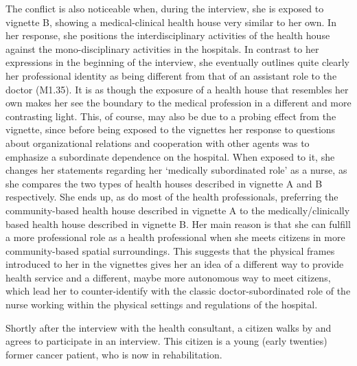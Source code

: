 \par
The conflict is also noticeable when, during the interview, she is exposed to vignette B, showing a medical-clinical health house very similar to her own. In her response, she positions the interdisciplinary activities of the health house against the mono-disciplinary activities in the hospitals. In contrast to her expressions in the beginning of the interview, she eventually outlines quite clearly her professional identity as being different from that of an assistant role to the doctor (M1.35). It is as though the exposure of a health house that resembles her own makes her see the boundary to the medical profession in a different and more contrasting light. This, of course, may also be due to a probing effect from the vignette, since before being exposed to the vignettes her response to questions about organizational relations and cooperation with other agents was to emphasize a subordinate dependence on the hospital. When exposed to it, she changes her statements regarding her ‘medically subordinated role’ as a nurse, as she compares the two types of health houses described in vignette A and B respectively. She ends up, as do most of the health professionals, preferring the community-based health house described in vignette A to the medically/clinically based health house described in vignette B. Her main reason is that she can fulfill a more professional role as a health professional when she meets citizens in more community-based spatial surroundings. This suggests that the physical frames introduced to her in the vignettes gives her an idea of a different way to provide health service and a different, maybe more autonomous way to meet citizens, which lead her to counter-identify with the classic doctor-subordinated role of the nurse working within the physical settings and regulations of the hospital.
\par
Shortly after the interview with the health consultant, a citizen walks by and agrees to participate in an interview. This citizen is a young (early twenties) former cancer patient, who is now in rehabilitation.

